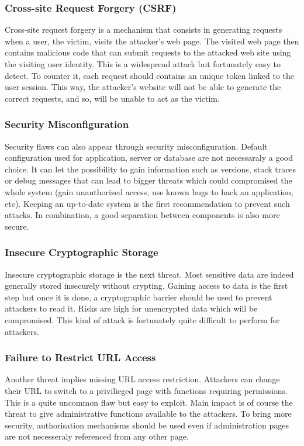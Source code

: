 \subsubsection{Cross-site Request Forgery (CSRF)}
Cross-site request forgery is a mechanism that consists in generating requests
when a user, the victim, visits the attacker's web page. The visited web page
then contains malicious code that can submit requests to the attacked web site
using the visiting user identity. This is a widespread attack but fortunately
easy to detect. To counter it, each request should contains an unique token
linked to the user session. This way, the attacker's website will not be able to
generate the correct requests, and so, will be unable to act as the victim.

\subsubsection{Security Misconfiguration}
Security flaws can also appear through security misconfiguration. Default
configuration used for application, server or database are not necessaraly a
good choice. It can let the possibility to gain information such as versions,
stack traces or debug messages that can lead to bigger threats which could
compromised the whole system (gain unauthorized access, use known bugs to hack
an application, etc). Keeping an up-to-date system is the first recommendation
to prevent such attacks. In combination, a good separation between components is
also more secure.

\subsubsection{Insecure Cryptographic Storage}
Insecure cryptographic storage is the next threat. Most sensitive data are
indeed generally stored insecurely without crypting. Gaining access to data is
the first step but once it is done, a cryptographic barrier should be used to
prevent attackers to read it. Risks are high for unencrypted data which will be
compromised. This kind of attack is fortunately quite difficult to perform for
attackers.

\subsubsection{Failure to Restrict URL Access}
Another threat implies missing URL access restriction. Attackers can change
their URL to switch to a privilieged page with functions requiring permissions.
This is a quite uncommon flaw but easy to exploit. Main impact is of course the
threat to give administrative functions available to the attackers. To bring
more security, authorisation mechanisms should be used even if administration
pages are not necesseraly referenced from any other page.


